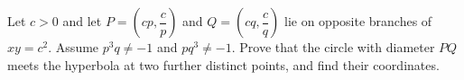 Let $c>0$ and let $P=(cp,\dfrac{c}{p})$ and $Q=(cq,\dfrac{c}{q})$ lie on opposite branches of $xy=c^2$. Assume $p^3q\ne-1$ and $pq^3\ne-1$. Prove that the circle with diameter $PQ$ meets the hyperbola at two further distinct points, and find their coordinates.
